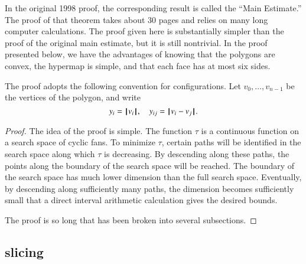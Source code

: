 \begin{remark}
In the original 1998 proof, the corresponding result
is called the ``Main Estimate.''  The proof of that 
theorem takes about 30 pages and relies on many
long computer calculations.  The proof given here
is substantially simpler than the proof of the original
main estimate, but
it is still nontrivial.  In the proof presented below, we have the advantages
of knowing that the polygons are convex, the hypermap
is simple, and that each face has at most six sides.
\end{remark}

The proof adopts the following convention for
configurations.  Let $v_0,\ldots,v_{n-1}$ be the vertices
of the polygon, and write
$$
y_i = {{\hskip0.1em|\hskip-0.15em|\hskip0.1em}v_i{\hskip0.1em|\hskip-0.15em|\hskip0.1em}},\quad y_{ij} = {\hskip0.1em|\hskip-0.15em|\hskip0.1em}v_i -  v_j{\hskip0.1em|\hskip-0.15em|\hskip0.1em}.
$$
%




\begin{proof}  
The idea of the proof is simple.  The function $\tau$ is a continuous function on a search space of cyclic fans.  To minimize $\tau$, certain paths will be identified in the search space along which $\tau$ is decreasing.  By descending along these paths, the points along the boundary of the search space will be reached.  The boundary of the search space has much lower dimension than the full search space. Eventually, by descending along sufficiently many paths, the dimension becomes sufficiently small that a direct interval arithmetic calculation gives the desired bounds.
%

The proof is so long that has been broken into several subsections.
\end{proof}


\subsection{slicing}
%

